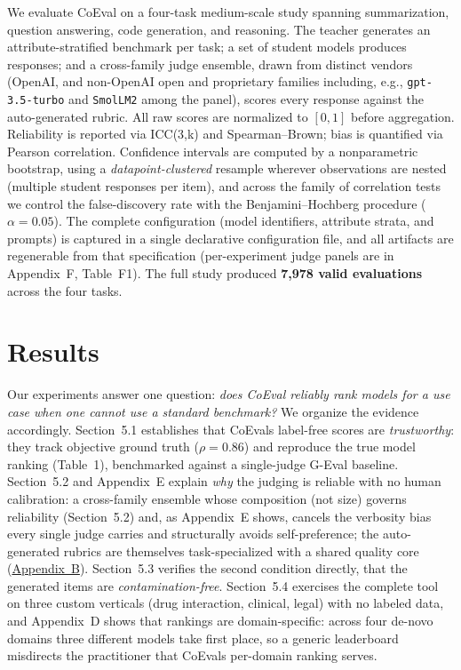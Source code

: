 \documentclass[11pt,a4paper]{article}
\begin{document}
We evaluate CoEval on a four-task medium-scale study spanning summarization, question answering, code generation, and
reasoning. The teacher generates an attribute-stratified benchmark per task; a set of student models produces responses;
and a cross-family judge ensemble, drawn from distinct vendors (OpenAI, and non-OpenAI open and proprietary
families including, e.g., \texttt{gpt-3.5-turbo} and \texttt{SmolLM2} among the panel), scores every
response against the auto-generated rubric. All raw scores are normalized to \([0,1]\) before aggregation. Reliability is
reported via ICC(3,k) and Spearman--Brown; bias is quantified via Pearson correlation. Confidence intervals are
computed by a nonparametric bootstrap, using a \emph{datapoint-clustered} resample wherever observations are nested
(multiple student responses per item), and across the family of correlation tests we control the false-discovery rate
with the Benjamini--Hochberg procedure (\(\alpha = 0.05\)). The complete configuration (model identifiers,
attribute strata, and prompts) is captured in a single declarative configuration file, and all artifacts are regenerable
from that specification (per-experiment judge panels are in Appendix~F, Table~F1). The full study produced \textbf{7,978 valid evaluations} across the four tasks.

\section{Results}\label{results}

Our experiments answer one question: \emph{does CoEval reliably rank models for a use case when one cannot use a
standard benchmark?} We organize the evidence accordingly. Section~5.1 establishes that CoEval\textquotesingle s label-free
scores are \emph{trustworthy}: they track objective ground truth (\(\rho = 0.86\)) and reproduce the true model
ranking (Table~1), benchmarked against a single-judge G-Eval baseline. Section~5.2 and Appendix~E explain
\emph{why} the judging is reliable with no human calibration: a cross-family ensemble whose composition (not size)
governs reliability (Section~5.2) and, as Appendix~E shows, cancels the verbosity bias every single judge
carries and structurally avoids self-preference; the auto-generated rubrics are themselves task-specialized with a shared quality core
(\hyperref[appB]{Appendix~B}). Section~5.3 verifies the second condition
directly, that the generated items are \emph{contamination-free}. Section~5.4 exercises the complete tool on three custom verticals (drug interaction, clinical, legal) with no labeled data, and Appendix~D shows that rankings are domain-specific: across four de-novo domains three different models take first place, so a generic leaderboard misdirects the practitioner that CoEval\textquotesingle s per-domain ranking serves.
\end{document}
